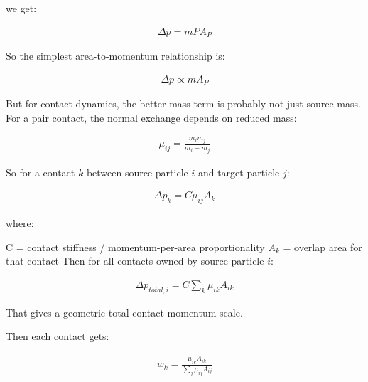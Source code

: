 we get:


\begin{equation}
\begin{aligned}
\label{none}
\Delta p = m P A_P
\end{aligned}
\end{equation}

So the simplest area-to-momentum relationship is:

\begin{equation}
\begin{aligned}
\label{none}
\Delta p \propto m A_P
\end{aligned}
\end{equation}

But for contact dynamics, the better mass term is probably not just source mass. For a pair contact, the normal exchange depends on reduced mass:

\begin{equation}
\begin{aligned}
\label{none}
\mu_{ij} = \frac{m_i m_j}{m_i + m_j}
\end{aligned}
\end{equation}

So for a contact $k$ between source particle $i$ and target particle $j$:

\begin{equation}
\begin{aligned}
\label{none}
\Delta p_k = C \mu_{ij} A_k
\end{aligned}
\end{equation}

where:

C = contact stiffness / momentum-per-area proportionality
$A_k$ = overlap area for that contact
Then for all contacts owned by source particle $i$:

\begin{equation}
\begin{aligned}
\label{none}
\Delta p_{total,i}= C \sum_k \mu_{ik} A_{ik}
\end{aligned}
\end{equation}

That gives a geometric total contact momentum scale.

Then each contact gets:

\begin{equation}
\begin{aligned}
\label{none}
w_k =
\frac{\mu_{ik} A_{ik}}
{\sum_j \mu_{ij} A_{ij}}
\end{aligned}
\end{equation}

